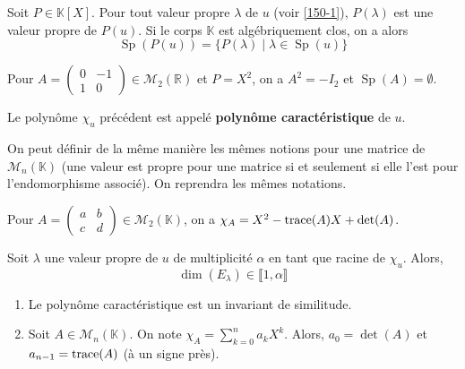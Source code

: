 
	\begin{theorem}
		Soit $P \in \mathbb{K}[X]$. Pour tout valeur propre $\lambda$ de $u$ (voir \cref{150-1}), $P(\lambda)$ est une valeur propre de $P(u)$. Si le corps $\mathbb{K}$ est algébriquement clos, on a alors
		\[ \operatorname{Sp}(P(u)) = \{ P(\lambda) \mid \lambda \in \operatorname{Sp}(u) \} \]
	\end{theorem}

	\begin{cexample}
		Pour $A = \begin{pmatrix} 0 & -1 \\ 1 & 0 \end{pmatrix} \in \mathcal{M}_2(\mathbb{R})$ et $P = X^2$, on a $A^2 = -I_2$ et $\operatorname{Sp}(A) = \emptyset$.
	\end{cexample}


	\begin{definition}
		Le polynôme $\chi_u$ précédent est appelé \textbf{polynôme caractéristique} de $u$.
	\end{definition}

	\begin{remark}
		On peut définir de la même manière les mêmes notions pour une matrice de $\mathcal{M}_n(\mathbb{K})$ (une valeur est propre pour une matrice si et seulement si elle l'est pour l'endomorphisme associé). On reprendra les mêmes notations.
	\end{remark}

	\begin{example}
		Pour $A = \begin{pmatrix} a & b \\ c & d \end{pmatrix} \in \mathcal{M}_2(\mathbb{K})$, on a $\chi_A = X^2 - \operatorname{trace}(A)X + \det(A)$.
	\end{example}

	\begin{proposition}
		Soit $\lambda$ une valeur propre de $u$ de multiplicité $\alpha$ en tant que racine de $\chi_u$. Alors,
		\[ \dim(E_\lambda) \in \llbracket 1, \alpha \rrbracket \]
	\end{proposition}


	\begin{proposition}
		\begin{enumerate}[label=(\roman*)]
			\item Le polynôme caractéristique est un invariant de similitude.
			\item Soit $A \in \mathcal{M}_n(\mathbb{K})$. On note $\chi_A = \sum_{k=0}^n a_k X^k$. Alors, $a_0 = \det(A)$ et $a_{n-1} = \operatorname{trace}(A)$ (à un signe près).
		\end{enumerate}
	\end{proposition}

